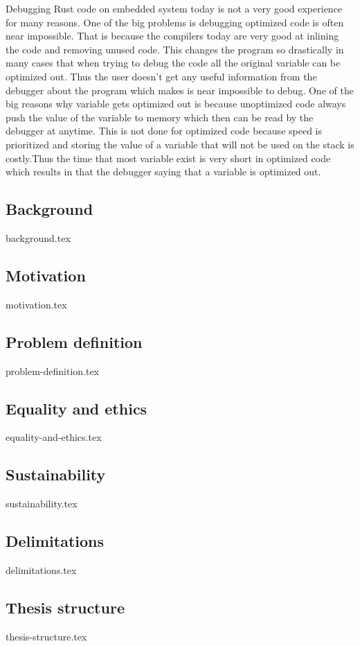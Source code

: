 
Debugging Rust code on embedded system today is not a very good experience for many reasons.
One of the big problems is debugging optimized code is often near impossible.
That is because the compilers today are very good at inlining the code and removing unused code.
This changes the program so drastically in many cases that when trying to debug the code all the original variable can be optimized out.
Thus the user doesn't get any useful information from the debugger about the program which makes is near impossible to debug.
One of the big reasons why variable gets optimized out is because unoptimized code always push the value of the variable to memory which then can be read by the debugger at anytime.
This is not done for optimized code because speed is prioritized and storing the value of a variable that will not be used on the stack is costly.Thus the time that most variable exist is very short in optimized code which results in that the debugger saying that a variable is optimized out.

\subsection{Background}
{background.tex}

\subsection{Motivation}
{motivation.tex}

\subsection{Problem definition}
{problem-definition.tex}

\subsection{Equality and ethics}
{equality-and-ethics.tex}

\subsection{Sustainability}
{sustainability.tex}

\subsection{Delimitations}
{delimitations.tex}

\subsection{Thesis structure}
{thesis-structure.tex}

